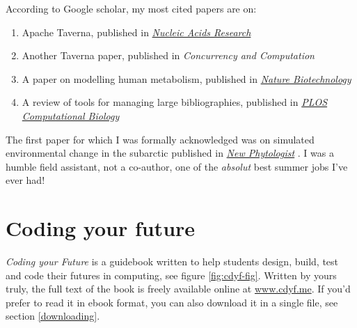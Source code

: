\documentclass[
  12pt,
]{book}
\providecommand{\tightlist}{%
  \setlength{\itemsep}{0pt}\setlength{\parskip}{0pt}}
\begin{document}
According to Google scholar, my most cited papers are on:

\begin{enumerate}
\def\labelenumi{\arabic{enumi}.}
\tightlist
\item
  Apache Taverna, published in \href{https://en.wikipedia.org/wiki/Nucleic_Acids_Research}{\emph{Nucleic Acids Research}} \citep{taverna}\\
\item
  Another Taverna paper, published in \emph{Concurrency and Computation} \citep{Oinn2006}\\
\item
  A paper on modelling human metabolism, published in \href{https://en.wikipedia.org/wiki/Nature_Biotechnology}{\emph{Nature Biotechnology}} \citep{Thiele2013}
\item
  A review of tools for managing large bibliographies, published in \href{https://en.wikipedia.org/wiki/PLOS_Computational_Biology}{\emph{PLOS Computational Biology}} \citep{defrosting}
\end{enumerate}

The first paper for which I was formally acknowledged was on simulated environmental change in the subarctic published in \href{https://en.wikipedia.org/wiki/New_Phytologist}{\emph{New Phytologist}} \citep{subarctic}. I was a humble field assistant, not a co-author, one of the \emph{absolut} best summer jobs I've ever had!

\hypertarget{coding-your-future}{%
\chapter{Coding your future}\label{coding-your-future}}

\emph{Coding your Future} is a guidebook written to help students design, build, test and code their futures in computing, see figure \ref{fig:cdyf-fig}. Written by yours truly, \citep{cdyf} the full text of the book is freely available online at \href{https://www.cdyf.me}{www.cdyf.me}. If you'd prefer to read it in ebook format, you can also download it in a single file, see section \ref{downloading}.
\end{document}
